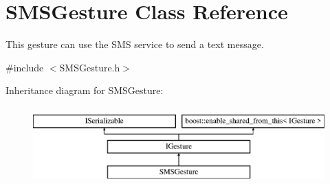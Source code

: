\hypertarget{class_s_m_s_gesture}{}\section{S\+M\+S\+Gesture Class Reference}
\label{class_s_m_s_gesture}


This gesture can use the S\+MS service to send a text message.  




{\ttfamily \#include $<$S\+M\+S\+Gesture.\+h$>$}

Inheritance diagram for S\+M\+S\+Gesture\+:\begin{figure}[H]
\begin{center}
\leavevmode
\includegraphics[height=3.000000cm]{class_s_m_s_gesture}
\end{center}
\end{figure}
